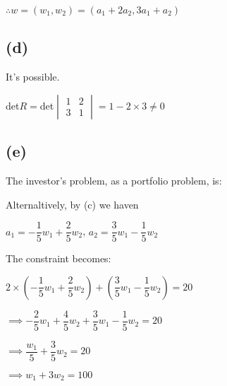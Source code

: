 \documentclass{article}
\begin{document}
$\therefore w=(w_{1}, w_{2})=\boxed{(a_{1}+2a_{2}, 3a_{1}+a_{2})}$

\subsection*{(d)}

It's possible. 

det$R=$det$\begin{vmatrix}
    1 & 2 \\
    3 & 1
\end{vmatrix}=1-2\times3\not=0$

\subsection*{(e)}

The investor's problem, as a portfolio problem, is:


Alternaltively, by (c) we haven

$a_{1}=-\dfrac{1}{5}w_{1}+\dfrac{2}{5}w_{2}$, $a_{2}=\dfrac{3}{5}w_{1}-\dfrac{1}{5}w_{2}$

The constraint becomes: 

$2\times\left(-\dfrac{1}{5}w_{1}+\dfrac{2}{5}w_{2}\right)+\left(\dfrac{3}{5}w_{1}-\dfrac{1}{5}w_{2}\right)=20$

$\implies -\dfrac{2}{5}w_{1}+\dfrac{4}{5}w_{2}+\dfrac{3}{5}w_{1}-\dfrac{1}{5}w_{2}=20$

$\implies \dfrac{w_{1}}{5}+\dfrac{3}{5}w_{2}=20$

$\implies w_{1}+3w_{2}=100$
\end{document}
